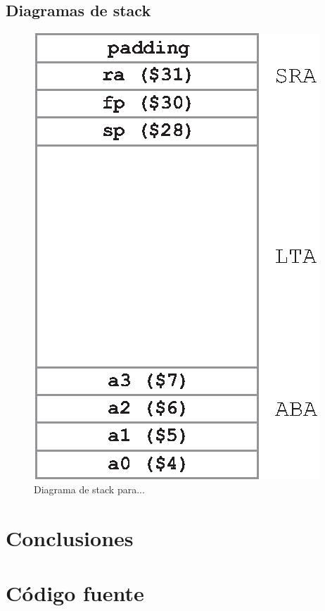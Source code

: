 \documentclass[a4paper, 12pt]{article}
\begin{document}
	\subsection{Diagramas de stack}
	
	\begin{figure}[H]
		\centering
		\includegraphics[scale=1]{files/stack_frame.eps}
		\caption{Diagrama de stack para...}
		\label{fig:diag:stack}
	\end{figure}
	\section{Conclusiones}
	
	\newpage
	\section{Código fuente}
	
\end{document}
